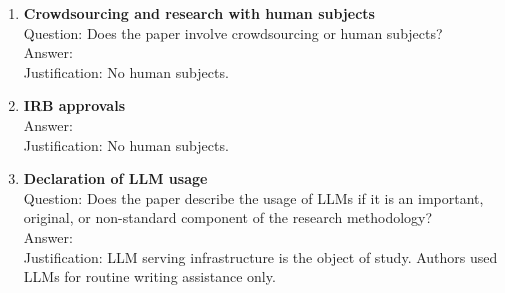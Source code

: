 \documentclass{article}
\begin{document}
\begin{enumerate}
\item {\bf Crowdsourcing and research with human subjects}\\
Question: Does the paper involve crowdsourcing or human subjects?\\
Answer: \answerNA{}\\
Justification: No human subjects.

\item {\bf IRB approvals}\\
Answer: \answerNA{}\\
Justification: No human subjects.

\item {\bf Declaration of LLM usage}\\
Question: Does the paper describe the usage of LLMs if it is an important, original, or non-standard component of the research methodology?\\
Answer: \answerNA{}\\
Justification: LLM serving infrastructure is the object of study. Authors used LLMs for routine writing assistance only.

\end{enumerate}
\fi

\newpage




\end{document}
